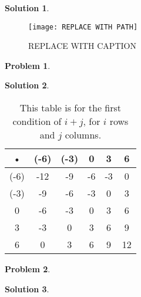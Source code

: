 \documentclass[10pt]{article}
\theoremstyle{plain}
\theoremstyle{definition}
\newtheorem{prob}{Problem}
\newtheorem*{sol}{Solution}
\theoremstyle{remark}
\begin{document}
\medskip

\begin{sol}

\end{sol}

\medskip

\begin{figure}[H]   %
\begin{center}
\texttt{[image:  REPLACE WITH PATH]} 
\end{center}
\caption{ REPLACE WITH CAPTION }
\end{figure}


\pagebreak

\begin{prob}

\end{prob}

\medskip

\begin{sol}

\end{sol}

\medskip

\begin{table}
\begin{center}
\begin{tabular}{|c|c|c|c|c|c|}
\hline 
• & (-6) & (-3) & 0 & 3 & 6 \\ 
\hline 
(-6) & -12 & -9 & -6 & -3 & 0 \\ 
\hline 
(-3) & -9 & -6 & -3 & 0 & 3 \\ 
\hline 
0 & -6 & -3 & 0 & 3 & 6 \\ 
\hline 
3 & -3 & 0 & 3 & 6 & 9 \\ 
\hline 
6 & 0 & 3 & 6 & 9 & 12 \\ 
\hline 
\end{tabular} 
\caption{This table is for the first condition of $i + j$, for $i$ rows and $j$ columns.}
\end{center}
\end{table}

\pagebreak

\begin{prob}

\end{prob}

\medskip

\begin{sol}

\end{sol}

\medskip

\begin{tikzpicture}

\end{tikzpicture}
\end{document}
